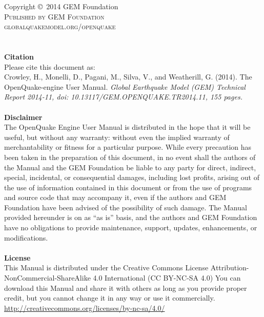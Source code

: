 \documentclass[11pt,fleqn]{book} %
\begin{document}
\noindent Copyright \copyright\ 2014 GEM Foundation\\ %

\noindent \textsc{Published by GEM Foundation}\\ %

\noindent \textsc{globalquakemodel.org/openquake}\\ %

\vspace{0.4cm} \hfill \\
\noindent \hfill \\
   {\textbf{Citation}} \hfill \\
   Please cite this document as: \hfill \\
   Crowley, H., Monelli, D., Pagani, M., Silva, V., 
   and Weatherill, G. (2014). 
   The OpenQuake-engine User Manual. 
   \textit{Global Earthquake Model (GEM) Technical Report 2014-11, 
   doi: 10.13117/\-GEM.OPENQUAKE.\-TR2014.11, 155 pages.} \\
   \hfill \\

\noindent
   {\bf{Disclaimer}} \hfill \\
   The OpenQuake Engine User Manual is distributed in the hope that it will be 
   useful, but without any warranty: without even the implied warranty of 
   merchantability or fitness for a particular purpose. While every precaution 
   has been taken in the preparation of this document, in no event shall the 
   authors of the Manual and the GEM Foundation be liable to any party for 
   direct, indirect, special, incidental, or consequential damages, including 
   lost profits, arising out of the use of information contained in this 
   document or from the use of programs and source code that may accompany it, 
   even if the authors and GEM Foundation have been advised of the possibility 
   of such damage. The Manual provided hereunder is on as ``as is'' basis, and the 
   authors and GEM Foundation have no obligations to provide maintenance, 
   support, updates, enhancements, or modifications. \hfill \\
   \hfill \\
\noindent
   {\bf{License}} \hfill \\
   This Manual is distributed under the Creative Commons License 
   Attribution-NonCommercial-ShareAlike 4.0 International (CC BY-NC-SA 4.0)
   You can download this Manual and share it with 
   others as long as you provide proper credit, but you cannot change 
   it in any way or use it commercially.\hfill \\
   \href{http://creativecommons.org/licenses/by-nc-sa/4.0/}
   {http://creativecommons.org/licenses/by-nc-sa/4.0/}\hfill \\
\end{document}
